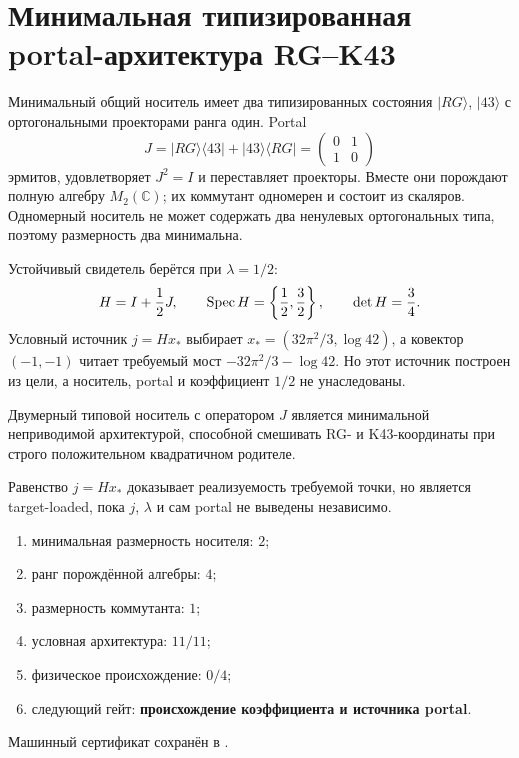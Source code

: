 \chapter{Минимальная типизированная portal-архитектура RG--K43}
\label{ch:v10-birth-tick-minimal-portal-architecture}

Минимальный общий носитель имеет два типизированных состояния
$\lvert RG\rangle$, $\lvert43\rangle$ с ортогональными проекторами ранга
один. Portal
\begin{equation}
 J=\lvert RG\rangle\langle43\rvert+\lvert43\rangle\langle RG\rvert
 =\begin{pmatrix}0&1\\1&0\end{pmatrix}
\end{equation}
эрмитов, удовлетворяет $J^2=I$ и переставляет проекторы. Вместе они
порождают полную алгебру $M_2(\mathbb C)$; их коммутант одномерен и состоит
из скаляров. Одномерный носитель не может содержать два ненулевых
ортогональных типа, поэтому размерность два минимальна.

Устойчивый свидетель берётся при $\lambda=1/2$:
\begin{equation}
 H=I+\frac12J,\qquad \operatorname{Spec} H=\left\{\frac12,\frac32\right\},
 \qquad \det H=\frac34.
\end{equation}
Условный источник $j=Hx_*$ выбирает
$x_*=(32\pi^2/3,\log42)$, а ковектор $(-1,-1)$ читает требуемый мост
$-32\pi^2/3-\log42$. Но этот источник построен из цели, а носитель, portal
и коэффициент $1/2$ не унаследованы.

\begin{theorem}
Двумерный типовой носитель с оператором $J$ является минимальной
неприводимой архитектурой, способной смешивать RG- и K43-координаты при
строго положительном квадратичном родителе.
\end{theorem}

\begin{nogocriterion}
Равенство $j=Hx_*$ доказывает реализуемость требуемой точки, но является
target-loaded, пока $j$, $\lambda$ и сам portal не выведены независимо.
\end{nogocriterion}

\begin{protocol}\begin{enumerate}
\item минимальная размерность носителя: \textbf{$2$};
\item ранг порождённой алгебры: \textbf{$4$};
\item размерность коммутанта: \textbf{$1$};
\item условная архитектура: \textbf{$11/11$};
\item физическое происхождение: \textbf{$0/4$};
\item следующий гейт: \textbf{происхождение коэффициента и источника portal}.
\end{enumerate}\end{protocol}

Машинный сертификат сохранён в
.